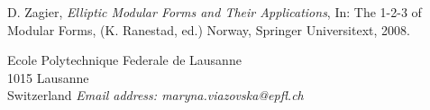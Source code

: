 \begin{thebibliography}{10}


   {\sc D. Zagier}, {\em Elliptic Modular Forms and Their Applications}, In:  The 1-2-3 of Modular Forms, (K. Ranestad, ed.) Norway, Springer Universitext, 2008.
  \end{thebibliography}

  \newpage

  {\footnotesize
  \noindent
  Ecole Polytechnique Federale de Lausanne\\
  1015 Lausanne\\
  Switzerland
  {\it Email address: maryna.viazovska@epfl.ch}}
